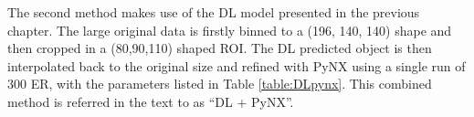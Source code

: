 \begin{table}[H]

  \centering
  \caption{PyNX parameter settings for standard PR. }
  \label{table:pynx}
  \end{table}
  
The second method makes use of the DL model presented in the previous chapter. The large original data is firstly binned to a (196, 140, 140) shape 
and then cropped in a (80,90,110) shaped ROI. The DL predicted object is then interpolated back to the original size and refined with 
PyNX using a single run of 300 ER, with the parameters listed in Table \ref{table:DLpynx}. This combined method is referred 
in the text to as ``DL + PyNX''. 

